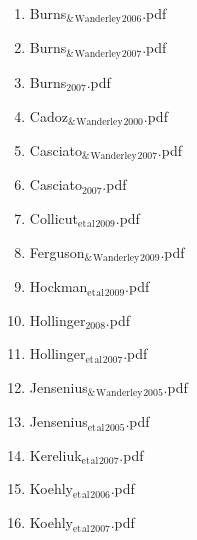 \documentclass[11pt]{article}
\begin{document}
\begin{enumerate}
\begin{enumerate}
\begin{enumerate}
\item Burns$_{\text{\&}}$$_{\text{Wanderley}}$$_{\text{2006}}$.pdf
\label{sec-1-1-1-1-49-2-1-7-9}

\item Burns$_{\text{\&}}$$_{\text{Wanderley}}$$_{\text{2007}}$.pdf
\label{sec-1-1-1-1-49-2-1-7-10}

\item Burns$_{\text{2007}}$.pdf
\label{sec-1-1-1-1-49-2-1-7-11}

\item Cadoz$_{\text{\&}}$$_{\text{Wanderley}}$$_{\text{2000}}$.pdf
\label{sec-1-1-1-1-49-2-1-7-12}

\item Casciato$_{\text{\&}}$$_{\text{Wanderley}}$$_{\text{2007}}$.pdf
\label{sec-1-1-1-1-49-2-1-7-13}

\item Casciato$_{\text{2007}}$.pdf
\label{sec-1-1-1-1-49-2-1-7-14}

\item Collicut$_{\text{et}}$$_{\text{al}}$$_{\text{2009}}$.pdf
\label{sec-1-1-1-1-49-2-1-7-15}

\item Ferguson$_{\text{\&}}$$_{\text{Wanderley}}$$_{\text{2009}}$.pdf
\label{sec-1-1-1-1-49-2-1-7-16}

\item Hockman$_{\text{et}}$$_{\text{al}}$$_{\text{2009}}$.pdf
\label{sec-1-1-1-1-49-2-1-7-17}

\item Hollinger$_{\text{2008}}$.pdf
\label{sec-1-1-1-1-49-2-1-7-18}

\item Hollinger$_{\text{et}}$$_{\text{al}}$$_{\text{2007}}$.pdf
\label{sec-1-1-1-1-49-2-1-7-19}

\item Jensenius$_{\text{\&}}$$_{\text{Wanderley}}$$_{\text{2005}}$.pdf
\label{sec-1-1-1-1-49-2-1-7-20}

\item Jensenius$_{\text{et}}$$_{\text{al}}$$_{\text{2005}}$.pdf
\label{sec-1-1-1-1-49-2-1-7-21}

\item Kereliuk$_{\text{et}}$$_{\text{al}}$$_{\text{2007}}$.pdf
\label{sec-1-1-1-1-49-2-1-7-22}

\item Koehly$_{\text{et}}$$_{\text{al}}$$_{\text{2006}}$.pdf
\label{sec-1-1-1-1-49-2-1-7-23}

\item Koehly$_{\text{et}}$$_{\text{al}}$$_{\text{2007}}$.pdf
\label{sec-1-1-1-1-49-2-1-7-24}


\end{enumerate}
\end{enumerate}
\end{enumerate}
\end{document}

